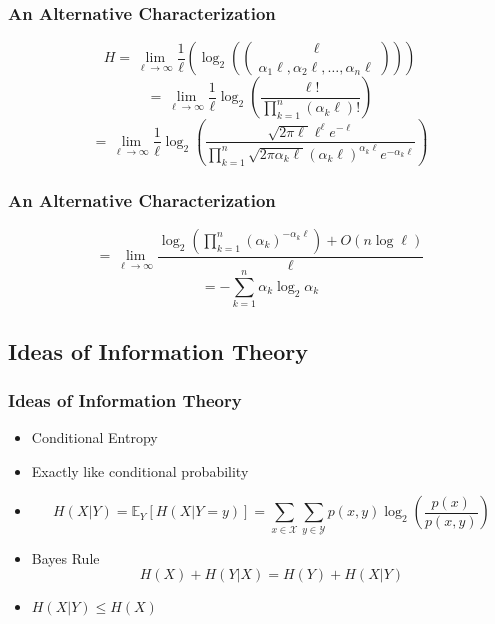 \documentclass[xcolor=dvipsnames]{beamer}
\begin{document}
	\begin{frame}
	\frametitle{An Alternative Characterization}
        $$ H = \displaystyle \lim_{\ell \to \infty} \frac{1}{\ell}\left(\log_2\left({\ell \choose \alpha_1\ell, \alpha_2\ell, \dots, \alpha_n\ell} \right)\right) $$ 
        \pause
        $$ = \lim_{\ell \to \infty} \frac{1}{\ell} \log_2\left(\frac{\ell!}{\displaystyle \prod_{k=1}^n (\alpha_k\ell)!}\right) $$
         \pause
         $$  = \lim_{\ell \to \infty} \frac{1}{\ell} \log_2\left(\frac{\sqrt{2\pi\ell}\ell^\ell e^{-\ell}}{\displaystyle \prod_{k=1}^n \sqrt{2\pi\alpha_k\ell}(\alpha_k\ell)^{\alpha_k\ell}e^{-\alpha_k\ell}}\right)$$ 
	\end{frame}
	
	\begin{frame}
	\frametitle{An Alternative Characterization}
         $$ = \lim_{\ell \to \infty} \frac{\displaystyle \log_2\left(\prod_{k=1}^n (\alpha_k)^{-\alpha_k\ell}\right) + O(n\log \ell)}{\ell}$$
         \pause $$ =  \boxed{-\sum_{k=1}^n\alpha_k \log_2 \alpha_k}$$
	\end{frame}
	
	\subsection{Ideas of Information Theory}
	\begin{frame}
	\frametitle{Ideas of Information Theory}
	\begin{itemize}
	    \item Conditional Entropy
	    \pause
	    \item Exactly like conditional probability
	    \pause
	    \item $$H(X|Y) = \mathbb{E}_Y[H(X|Y = y)] = \sum_{x \in \mathcal{X}}\sum_{y \in \mathcal{Y}}p(x, y) \log_2 \left(\frac{p(x)}{p(x, y)} \right)$$
	    \pause
	    \item Bayes Rule $$ H(X) + H(Y|X) = H(Y) + H(X|Y) $$
	    \pause
	    \item $ H(X|Y) \leq H(X) $
	\end{itemize}
	\end{frame}
	
\end{document}
